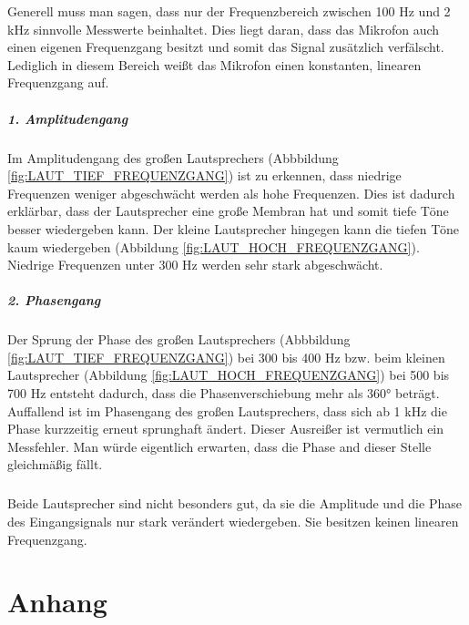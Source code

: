 \documentclass[12pt,oneside,a4paper]{report}
\begin{document}
Generell muss man sagen, dass nur der Frequenzbereich zwischen 100 Hz und 2 kHz sinnvolle Messwerte beinhaltet. Dies liegt daran, dass das Mikrofon auch einen eigenen Frequenzgang besitzt und somit das Signal zusätzlich verfälscht. Lediglich in diesem Bereich weißt das Mikrofon einen konstanten, linearen Frequenzgang auf.

\paragraph{1. Amplitudengang}

Im Amplitudengang des großen Lautsprechers (Abbbildung \ref{fig:LAUT_TIEF_FREQUENZGANG}) ist zu erkennen, dass niedrige Frequenzen weniger abgeschwächt werden als hohe Frequenzen.
Dies ist dadurch erklärbar, dass der Lautsprecher eine große Membran hat und somit tiefe Töne besser wiedergeben kann. 
Der kleine Lautsprecher hingegen kann die tiefen Töne kaum wiedergeben (Abbildung \ref{fig:LAUT_HOCH_FREQUENZGANG}). Niedrige Frequenzen unter 300 Hz werden sehr stark abgeschwächt.

\paragraph{2. Phasengang}

Der Sprung der Phase des großen Lautsprechers (Abbbildung \ref{fig:LAUT_TIEF_FREQUENZGANG}) bei 300 bis 400 Hz bzw. beim kleinen Lautsprecher (Abbildung \ref{fig:LAUT_HOCH_FREQUENZGANG}) bei 500 bis 700 Hz entsteht dadurch, dass die Phasenverschiebung mehr als 360° beträgt.
Auffallend ist im Phasengang des großen Lautsprechers, dass sich ab 1 kHz die Phase kurzzeitig erneut sprunghaft ändert. Dieser Ausreißer ist vermutlich ein Messfehler. Man würde eigentlich erwarten, dass die Phase and dieser Stelle gleichmäßig fällt.

\paragraph{}

Beide Lautsprecher sind nicht besonders gut, da sie die Amplitude und die Phase des Eingangsignals nur stark verändert wiedergeben. Sie besitzen keinen linearen Frequenzgang. 
%
%
\renewcommand\thesection{A.\arabic{section}}
\renewcommand\thesubsection{\thesection.\arabic{subsection}}

\chapter*{Anhang}
\label{chap:APPENDIX}
\addtocounter{chapter}{1}
\setcounter{section}{0}
\end{document}
